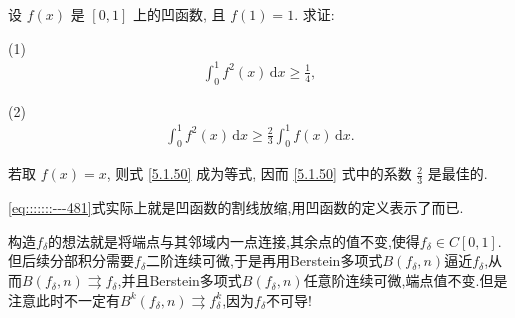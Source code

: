 \documentclass[../../main.tex]{subfiles}
\begin{document}
\begin{example}
设 \( f(x) \) 是 \([0,1]\) 上的凹函数, 且 \( f(1) = 1 \). 求证:

(1)\begin{align}
\int_{0}^{1} f^2(x) \, \mathrm{d}x \geqslant \frac{1}{4}, \label{5.1.49}
\end{align}

(2)\begin{align}
\int_{0}^{1} f^2(x) \, \mathrm{d}x \geqslant \frac{2}{3} \int_{0}^{1} f(x) \, \mathrm{d}x. \label{5.1.50}
\end{align}
\end{example}
\begin{remark}
若取 \( f(x) = x \), 则式 \eqref{5.1.50} 成为等式, 因而 \eqref{5.1.50} 式中的系数 \( \frac{2}{3} \) 是最佳的.
\end{remark}
\begin{remark}
\eqref{eq:::::::---481}式实际上就是凹函数的割线放缩,用凹函数的定义表示了而已.
\end{remark}
\begin{note}
构造$f_\delta$的想法就是将端点与其邻域内一点连接,其余点的值不变,使得$f_\delta\in C[0,1]$.但后续分部积分需要$f_\delta$二阶连续可微,于是再用Berstein多项式$B(f_\delta,n)$逼近$f_\delta$,从而$B(f_{\delta},n)\rightrightarrows f_{\delta}$,并且Berstein多项式$B(f_\delta,n)$任意阶连续可微,端点值不变.但是注意此时不一定有$B^k(f_{\delta},n)\rightrightarrows f_{\delta}^{k}$,因为$f_\delta$不可导!
\end{note}
\end{document}
